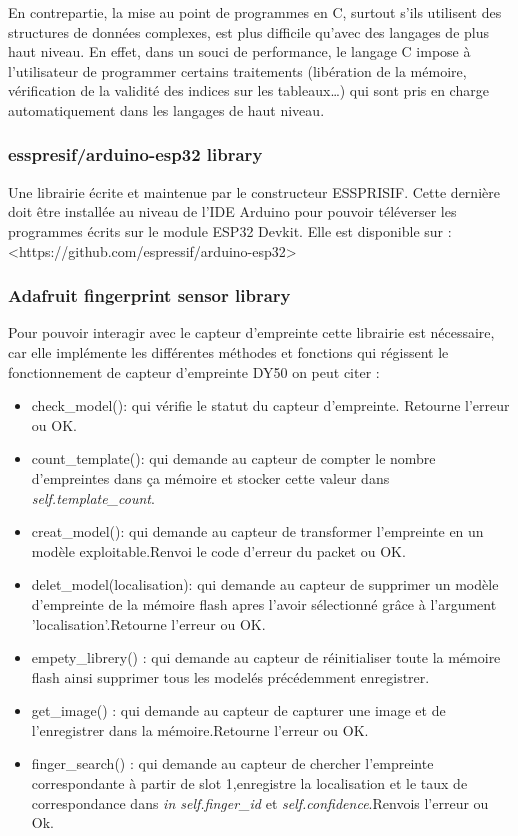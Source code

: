 En contrepartie, la mise au point de programmes en C, surtout s’ils utilisent 
des structures de données complexes, est plus difficile qu’avec des langages de 
plus haut niveau. En effet, dans un souci de performance, le langage C impose à 
l’utilisateur de programmer certains traitements (libération de la mémoire, 
vérification de la validité des indices sur les tableaux…) qui sont pris en 
charge automatiquement dans les langages de haut niveau\cite{35}.
                
                
\subsubsection{esspresif/arduino-esp32 library}
Une librairie écrite et maintenue par le constructeur ESSPRISIF. Cette dernière 
doit être installée au niveau de l'IDE Arduino pour pouvoir téléverser les 
programmes écrits sur le module ESP32 Devkit. Elle est disponible sur : 
<https://github.com/espressif/arduino-esp32>

\subsubsection{Adafruit fingerprint sensor library}
Pour pouvoir interagir avec le capteur d'empreinte cette librairie est 
nécessaire, car elle implémente les différentes méthodes et fonctions qui 
régissent le fonctionnement de capteur d'empreinte DY50 on peut citer :

\begin{itemize}
    \item[\textbullet] check\_model(): qui vérifie le statut du capteur d'empreinte. 
    Retourne l'erreur ou OK.
    \item[\textbullet] count\_template(): qui demande au capteur de compter le 
    nombre d'empreintes dans ça mémoire et stocker cette valeur dans 
    \emph{self.template\_count}.
    \item[\textbullet] creat\_model(): qui demande au capteur de transformer 
    l'empreinte en un modèle exploitable.Renvoi le code d'erreur du packet ou OK.
    \item[\textbullet] delet\_model(localisation): qui demande au capteur de 
    supprimer un modèle d'empreinte de la mémoire flash apres l'avoir sélectionné 
    grâce à l'argument 'localisation'.Retourne l'erreur ou OK.
    \item[\textbullet] empety\_librery() : qui demande au capteur de réinitialiser 
    toute la mémoire flash ainsi supprimer tous les modelés précédemment 
    enregistrer. 
    \item[\textbullet] get\_image() : qui demande au capteur de capturer une image 
    et de l'enregistrer dans la mémoire.Retourne l'erreur ou OK. 
    \item[\textbullet] finger\_search() : qui demande au capteur de chercher 
    l'empreinte correspondante à partir de slot 1,enregistre la localisation 
    et le taux de correspondance dans \emph{in self.finger\_id} et 
    \emph{self.confidence}.Renvois l'erreur ou Ok.\cite{36}
\end{itemize}
              
